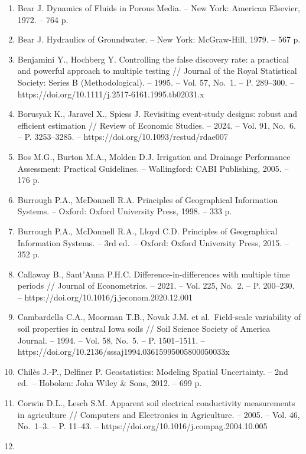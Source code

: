 \documentclass[14pt,a4paper,oneside]{extreport}
\begin{document}
\begin{enumerate}
  and Drainage Paper 29 (Rev.~1). -- Rome: FAO, 1985. -- 174 p.
\item
  Bear J. Dynamics of Fluids in Porous Media. -- New York: American
  Elsevier, 1972. -- 764 p.
\item
  Bear J. Hydraulics of Groundwater. -- New York: McGraw-Hill, 1979. --
  567 p.
\item
  Benjamini Y., Hochberg Y. Controlling the false discovery rate: a
  practical and powerful approach to multiple testing // Journal of the
  Royal Statistical Society: Series B (Methodological). -- 1995. -- Vol.
  57, No.~1. -- P. 289--300. --
  https://doi.org/10.1111/j.2517-6161.1995.tb02031.x
\item
  Borusyak K., Jaravel X., Spiess J. Revisiting event-study designs:
  robust and efficient estimation // Review of Economic Studies. --
  2024. -- Vol. 91, No.~6. -- P. 3253--3285. --
  https://doi.org/10.1093/restud/rdae007
\item
  Bos M.G., Burton M.A., Molden D.J. Irrigation and Drainage Performance
  Assessment: Practical Guidelines. -- Wallingford: CABI Publishing,
  2005. -- 176 p.
\item
  Burrough P.A., McDonnell R.A. Principles of Geographical Information
  Systems. -- Oxford: Oxford University Press, 1998. -- 333 p.
\item
  Burrough P.A., McDonnell R.A., Lloyd C.D. Principles of Geographical
  Information Systems. -- 3rd ed.~-- Oxford: Oxford University Press,
  2015. -- 352 p.
\item
  Callaway B., Sant'Anna P.H.C. Difference-in-differences with multiple
  time periods // Journal of Econometrics. -- 2021. -- Vol. 225, No.~2.
  -- P. 200--230. -- https://doi.org/10.1016/j.jeconom.2020.12.001
\item
  Cambardella C.A., Moorman T.B., Novak J.M. et al.~Field-scale
  variability of soil properties in central Iowa soils // Soil Science
  Society of America Journal. -- 1994. -- Vol. 58, No.~5. -- P.
  1501--1511. -- https://doi.org/10.2136/sssaj1994.03615995005800050033x
\item
  Chilès J.-P., Delfiner P. Geostatistics: Modeling Spatial Uncertainty.
  -- 2nd ed.~-- Hoboken: John Wiley \& Sons, 2012. -- 699 p.
\item
  Corwin D.L., Lesch S.M. Apparent soil electrical conductivity
  measurements in agriculture // Computers and Electronics in
  Agriculture. -- 2005. -- Vol. 46, No.~1--3. -- P. 11--43. --
  https://doi.org/10.1016/j.compag.2004.10.005
\item

\end{enumerate}
\end{document}
